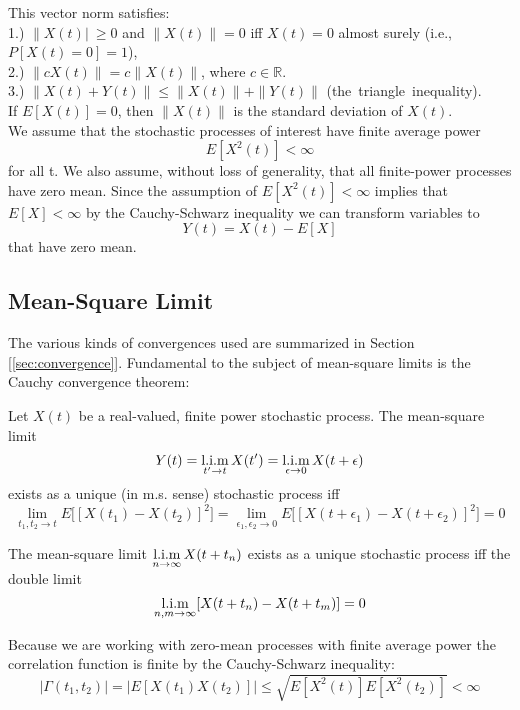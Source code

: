 This vector norm satisfies:\\

1.) $\| X(t) |\ \ge 0$ and $\| X(t) \|= 0$ iff $X(t) = 0$ almost surely (i.e., $P[X(t) = 0] = 1$),\\ 
2.) $\| c X(t) \| = c \| X(t) \| $, where $c \in \mathbb{R}$.\\
3.) $\|  X(t) +Y(t) \|  \le \| X(t) \| + \| Y(t) \|$ \quad \hbox{(the triangle inequality)}. \\ 
 
 If $E[X(t)] = 0$, then $\| X(t) \|$ is the standard deviation of $X(t)$.\\

We assume that the stochastic processes of interest have finite average power $$E[X^2(t)] < \infty$$ for all t. We also assume, without loss of generality, that all finite-power processes have zero mean. Since the assumption of $E[X^2(t)] < \infty$ implies that $E[X] < \infty$ by the Cauchy-Schwarz inequality we can transform variables to 
$$Y(t) = X(t) - E[X]$$ that have zero mean. \\

\subsection{Mean-Square Limit}

The various kinds of convergences used are summarized in Section [\ref{sec:convergence}]. Fundamental to the subject of mean-square limits is the Cauchy convergence theorem: 

\begin{theorem}
Let $X(t)$ be a real-valued, finite power stochastic process. The mean-square limit
\[ Y(t) = \mslim_{t'\to t} X(t') = \mslim_{\epsilon \to 0} X(t+\epsilon) \]
exists as a unique (in m.s. sense) stochastic process iff 
\[ \lim_{t_1, t_2 \to t} E\Big[ [X(t_1) - X(t_2) ]^2  \Big] = \lim_{\epsilon_1, \epsilon_2 \to 0} E\Big[  [X(t+\epsilon_1) - X(t+\epsilon_2)]^2  \Big]  = 0 \]
\end{theorem}

\begin{definition}
The mean-square limit $\displaystyle{\mslim_{\ninfty} X(t+t_n)}$ exists as a unique stochastic process iff the double limit
\[ \mslim_{n, m \to \infty} [X(t+t_n) - X(t + t_m)]  = 0 \]
\end{definition}

Because we are working with zero-mean processes with finite average power the correlation function is finite by the Cauchy-Schwarz inequality:
\[ | \Gamma(t_1, t_2) | = | E[X(t_1) X(t_2)] | \le \sqrt{E[X^2(t)] E[X^2(t_2)]} < \infty \]


